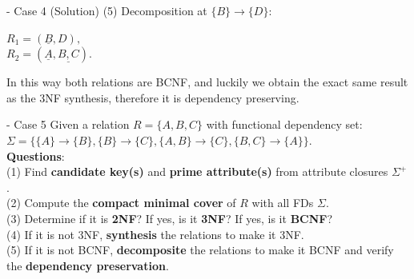 \begin{frame}[fragile]{ - Case 4 (Solution)}
	(5) Decomposition at $\{B\} \rightarrow \{D\}$:\\\vspace{5pt}
	
	$R_1 = (\underline{B}, D),$\\
	$R_2 = (\underline{A}, \underline{B, C}).$\\\vspace{5pt}
	
	In this way both relations are BCNF, and luckily we obtain the exact same result as the 3NF synthesis, therefore it is dependency preserving.\\\vspace{5pt}
	
\end{frame}

\begin{frame}[fragile]{ - Case 5}
	Given a relation $R=\{A, B, C\}$ with functional dependency set:\\ 
	$\Sigma=\{\{A\} \rightarrow \{B\},\{B\} \rightarrow \{C\}, \{A, B\} \rightarrow \{C\},\{B, C\} \rightarrow \{A\}\}.$\\\vspace{10pt}
	\textbf{Questions}:\\
	(1) Find \textbf{candidate key(s)} and \textbf{prime attribute(s)} from attribute closures $\Sigma^{+}$.\\
	(2) Compute the \textbf{compact minimal cover} of $R$ with all FDs $\Sigma$.\\
	(3) Determine if it is \textbf{2NF}? If yes, is it \textbf{3NF}? If yes, is it \textbf{BCNF}?\\
	(4) If it is not 3NF, \textbf{synthesis} the relations to make it 3NF.\\
	(5) If it is not BCNF, \textbf{decomposite} the relations to make it BCNF and verify the \textbf{dependency preservation}. 
\end{frame}

